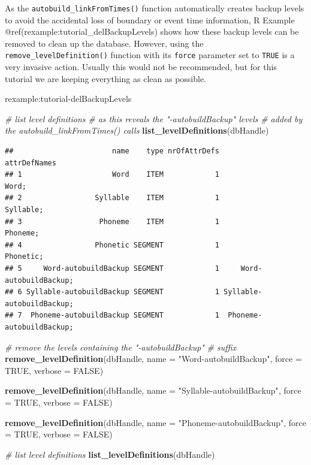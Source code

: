 \documentclass[]{book}
\newenvironment{Shaded}{\begin{snugshade}}{\end{snugshade}}
\newcommand{\CommentTok}[1]{\textcolor[rgb]{0.56,0.35,0.01}{\textit{#1}}}
\newcommand{\DataTypeTok}[1]{\textcolor[rgb]{0.13,0.29,0.53}{#1}}
\newcommand{\KeywordTok}[1]{\textcolor[rgb]{0.13,0.29,0.53}{\textbf{#1}}}
\newcommand{\NormalTok}[1]{#1}
\newcommand{\OtherTok}[1]{\textcolor[rgb]{0.56,0.35,0.01}{#1}}
\newcommand{\StringTok}[1]{\textcolor[rgb]{0.31,0.60,0.02}{#1}}
\theoremstyle{definition}
\theoremstyle{definition}
\theoremstyle{definition}
\theoremstyle{remark}
\begin{document}
As the \texttt{autobuild\_linkFromTimes()} function automatically
creates backup levels to avoid the accidental loss of boundary or event
time information, R Example @ref(rexample:tutorial\_delBackupLevels)
shows how these backup levels can be removed to clean up the database.
However, using the \texttt{remove\_levelDefinition()} function with its
\texttt{force} parameter set to \texttt{TRUE} is a very invasive action.
Usually this would not be recommended, but for this tutorial we are
keeping everything as clean as possible.

rexample:tutorial-delBackupLevels

\begin{Shaded}
\begin{Highlighting}[]
\CommentTok{# list level definitions}
\CommentTok{# as this reveals the "-autobuildBackup" levels}
\CommentTok{# added by the autobuild_linkFromTimes() calls}
\KeywordTok{list_levelDefinitions}\NormalTok{(dbHandle)}
\end{Highlighting}
\end{Shaded}

\begin{verbatim}
##                       name    type nrOfAttrDefs              attrDefNames
## 1                     Word    ITEM            1                     Word;
## 2                 Syllable    ITEM            1                 Syllable;
## 3                  Phoneme    ITEM            1                  Phoneme;
## 4                 Phonetic SEGMENT            1                 Phonetic;
## 5     Word-autobuildBackup SEGMENT            1     Word-autobuildBackup;
## 6 Syllable-autobuildBackup SEGMENT            1 Syllable-autobuildBackup;
## 7  Phoneme-autobuildBackup SEGMENT            1  Phoneme-autobuildBackup;
\end{verbatim}

\begin{Shaded}
\begin{Highlighting}[]
\CommentTok{# remove the levels containing the "-autobuildBackup"}
\CommentTok{# suffix}
\KeywordTok{remove_levelDefinition}\NormalTok{(dbHandle,}
                       \DataTypeTok{name =} \StringTok{"Word-autobuildBackup"}\NormalTok{,}
                       \DataTypeTok{force =} \OtherTok{TRUE}\NormalTok{,}
                       \DataTypeTok{verbose =} \OtherTok{FALSE}\NormalTok{)}

\KeywordTok{remove_levelDefinition}\NormalTok{(dbHandle,}
                       \DataTypeTok{name =} \StringTok{"Syllable-autobuildBackup"}\NormalTok{,}
                       \DataTypeTok{force =} \OtherTok{TRUE}\NormalTok{,}
                       \DataTypeTok{verbose =} \OtherTok{FALSE}\NormalTok{)}

\KeywordTok{remove_levelDefinition}\NormalTok{(dbHandle,}
                       \DataTypeTok{name =} \StringTok{"Phoneme-autobuildBackup"}\NormalTok{,}
                       \DataTypeTok{force =} \OtherTok{TRUE}\NormalTok{,}
                       \DataTypeTok{verbose =} \OtherTok{FALSE}\NormalTok{)}

\CommentTok{# list level definitions}
\KeywordTok{list_levelDefinitions}\NormalTok{(dbHandle)}
\end{Highlighting}
\end{Shaded}
\end{document}
